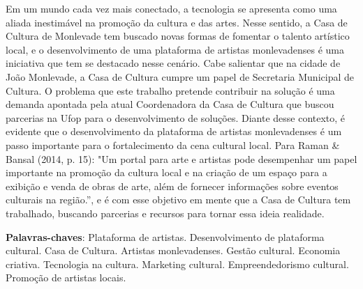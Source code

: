 \setlength{\absparsep}{18pt} %

\begin{resumo}
Em um mundo cada vez mais conectado, a tecnologia se apresenta como uma aliada inestimável na promoção da cultura e das artes. Nesse sentido, a Casa de Cultura de Monlevade tem buscado novas formas de fomentar o talento artístico local, e o desenvolvimento de uma plataforma de artistas monlevadenses é uma iniciativa que tem se destacado nesse cenário. Cabe salientar que na cidade de João Monlevade, a Casa de Cultura cumpre um  papel de Secretaria Municipal de Cultura. O problema que este trabalho pretende contribuir na solução é uma demanda apontada pela atual Coordenadora da Casa de Cultura que buscou parcerias na Ufop para o desenvolvimento de soluções. Diante desse contexto, é evidente que o desenvolvimento da plataforma de artistas monlevadenses é um passo importante para o fortalecimento da cena cultural local. Para Raman & Bansal (2014, p. 15): "Um portal para arte e artistas pode desempenhar um papel importante na promoção da cultura local e na criação de um espaço para a exibição e venda de obras de arte, além de fornecer informações sobre eventos culturais na região.”,  e é com esse objetivo em mente que a Casa de Cultura tem trabalhado, buscando parcerias e recursos para tornar essa ideia realidade.


 \textbf{Palavras-chaves}:     Plataforma de artistas.
    Desenvolvimento de plataforma cultural.
    Casa de Cultura.
    Artistas monlevadenses.
    Gestão cultural.
    Economia criativa.
    Tecnologia na cultura.
    Marketing cultural.
    Empreendedorismo cultural.
    Promoção de artistas locais.
\end{resumo}
